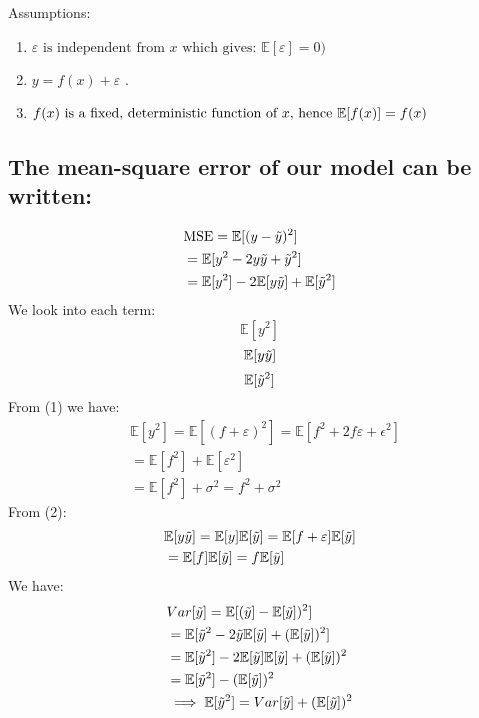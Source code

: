 Assumptions:
\begin{enumerate}
    \item $\varepsilon \text{ is independent from } x \text{ which gives: }\mathbb{E}[\varepsilon]=0)$
    \item $y=f(x) + \varepsilon$ .
    \item $f(x) \text{ is a fixed, deterministic function of } x \text{, hence }\\ \mathbb{E}[f(x)]=f(x)$
\end{enumerate}
\hfill\break
\subsection{The mean-square error of our model can be written:}
%
%
\begin{align*}
    & \text{MSE} = \mathbb{E}[(y-\Tilde{y})^2]\\
    & = \mathbb{E}[y^2-2y\Tilde{y}+\Tilde{y}^2]\\
    & = \mathbb{E}[y^2]-2\mathbb{E}[y\Tilde{y}]+\mathbb{E}[\Tilde{y}^2]\\
\end{align*}
%
We look into each term:
\begin{equation}
\mathbb{E}[y^2]
\end{equation}
\begin{equation}
    \mathbb{E}[y\Tilde{y}]
\end{equation}
\begin{equation}
    \mathbb{E}[\Tilde{y}^2]
\end{equation}
%
From (1) we have:
 \begin{align*}
     & \mathbb{E}[y^2]=\mathbb{E}[(f+\varepsilon)^2]=\mathbb{E}[f^2+2f\varepsilon+\epsilon^2]\\
     & = \mathbb{E}[f^2]+\mathbb{E}[\varepsilon^2]\\
     & =  \mathbb{E}[f^2]+\sigma^2 = f^2+\sigma^2
 \end{align*}
From (2):
\begin{align*}
    & \mathbb{E}[y\Tilde{y}]=\mathbb{E}[y]\mathbb{E}[\Tilde{y}]
     = \mathbb{E}[f+\varepsilon]\mathbb{E}[\Tilde{y}]\\
    & =\mathbb{E}[f]\mathbb{E}[\Tilde{y}]=f\mathbb{E}[\Tilde{y}]
\end{align*}
We have:
\begin{align*}
    & Var[\Tilde{y}]=\mathbb{E}[(\Tilde{y}]-\mathbb{E}[\Tilde{y}])^2]\\
    & = \mathbb{E}[\Tilde{y}^2-2\Tilde{y}\mathbb{E}[\Tilde{y}]+(\mathbb{E}[\Tilde{y}])^2]\\
    & = \mathbb{E}[\Tilde{y}^2]-2\mathbb{E}[\Tilde{y}]\mathbb{E}[\Tilde{y}]+(\mathbb{E}[\Tilde{y}])^2\\
    & = \mathbb{E}[\Tilde{y}^2]-(\mathbb{E}[\Tilde{y}])^2\\
    & \implies \mathbb{E}[\Tilde{y}^2]= Var[\Tilde{y}]+(\mathbb{E}[\Tilde{y}])^2
\end{align*}
